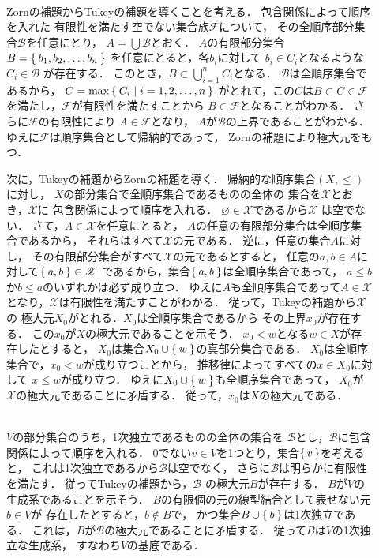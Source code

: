 \begin{description}
\item[] \mbox{} \\
  Zornの補題からTukeyの補題を導くことを考える．
  包含関係によって順序を入れた
  有限性を満たす空でない集合族$\mathscr{F}$について，
  その全順序部分集合$\mathscr{B}$を任意にとり，
  $A = \bigcup \mathscr{B}$とおく．
  $A$の有限部分集合$B = \Set{ b_1, b_2, \ldots, b_n}$
  を任意にとると，各$b_i$に対して
  $b_i \in C_i$となるような$C_i \in \mathscr{B}$
  が存在する．
  このとき，$B \subset \bigcup_{i=1}^{n} C_i$となる．
  $\mathscr{B}$は全順序集合であるから，
  $C= \max \Set{ C_i \mid i= 1, 2, \ldots , n}$
  がとれて，この$C$は$B \subset C \in \mathscr{F}$
  を満たし，$\mathscr{F}$が有限性を満たすことから
  $B \in \mathscr{F}$となることがわかる．
  さらに$\mathscr{F}$の有限性により
  $A \in \mathscr{F}$となり，
  $A$が$\mathscr{B}$の上界であることがわかる．
  ゆえに$\mathscr{F}$は順序集合として帰納的であって，
  Zornの補題により極大元をもつ．

  次に，Tukeyの補題からZornの補題を導く．
  帰納的な順序集合$(X, \leq)$に対し，
  $X$の部分集合で全順序集合であるものの全体の
  集合を$\mathscr{X}$とおき，$\mathscr{X}$に
  包含関係によって順序を入れる．
  $\varnothing \in \mathscr{X}$であるから$\mathscr{X}$
  は空でない．
  さて，$A \in \mathscr{X}$を任意にとると，
  $A$の任意の有限部分集合は全順序集合であるから，
  それらはすべて$\mathscr{X}$の元である．
  逆に，任意の集合$A$に対し，
  その有限部分集合がすべて$\mathscr{X}$の元であるとすると，
  任意の$a, b \in A$に対して$\Set{ a, b } \in \mathscr{X}$
  であるから，集合$\Set{ a,b}$は全順序集合であって，
  $a \leq b$か$b \leq a$のいずれかは必ず成り立つ．
  ゆえに$A$も全順序集合であって$A \in \mathscr{X}$
  となり，$\mathscr{X}$は有限性を満たすことがわかる．
  従って，Tukeyの補題から$\mathscr{X}$の
  極大元$X_0$がとれる．$X_0$は全順序集合であるから
  その上界$x_0$が存在する．
  この$x_0$が$X$の極大元であることを示そう．
  $x_0 < w$となる$w \in X$が存在したとすると，
  $X_0$は集合$X_0 \cup \Set{ w }$の真部分集合である．
  $X_0$は全順序集合で，$x_0 < w$が成り立つことから，
  推移律によってすべての$x \in X_0$に対して
  $x \leq w$が成り立つ．
  ゆえに$X_0 \cup \Set{w}$も全順序集合であって，
  $X_0$が$\mathscr{X}$の極大元であることに矛盾する．
  従って，$x_0$は$X$の極大元である．

\item[] \mbox{} \\
  $V$の部分集合のうち，1次独立であるものの全体の集合を
  $\mathscr{B}$とし，$\mathscr{B}$に包含関係によって順序を入れる．
  $0$でない$v \in V$を1つとり，集合$\set{ v}$を考えると，
  これは1次独立であるから$\mathscr{B}$は空でなく，
  さらに$\mathscr{B}$は明らかに有限性を満たす．
  従ってTukeyの補題から，$\mathscr{B}$
  の極大元$B$が存在する．
  $B$が$V$の生成系であることを示そう．
  $B$の有限個の元の線型結合として表せない元$b \in V$が
  存在したとすると，$b \notin B$で，
  かつ集合$B \cup \Set{ b}$は1次独立である．
  これは，$B$が$\mathscr{B}$の極大元であることに矛盾する．
  従って$B$は$V$の1次独立な生成系，
  すなわち$V$の基底である．






\end{description}
